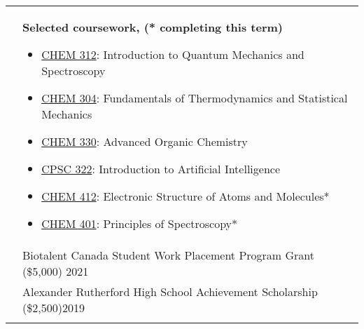 \documentclass[letterpaper, 11pt]{article}
\begin{document}
\begin{longtable}{p{1.3in}p{4.8in}}
	 & \textbf{Selected coursework, (* completing this term)}
	\begin{itemize}[noitemsep,leftmargin=*]
		\item \underline{CHEM 312}: Introduction to Quantum Mechanics and Spectroscopy
		\item \underline{CHEM 304}: Fundamentals of Thermodynamics and Statistical Mechanics
		\item \underline{CHEM 330}: Advanced Organic Chemistry
		\item \underline{CPSC 322}: Introduction to Artificial Intelligence
		\item \underline{CHEM 412}: Electronic Structure of Atoms and Molecules*
		\item \underline{CHEM 401}: Principles of Spectroscopy*
	\end{itemize}                                                                                                                       \\



	{\color{Blue}{Honours and}}
	 & Biotalent Canada Student Work Placement Program Grant (\$5,000) \hfill 2021                                                                                                                            \\
	{\color{Blue}{Scholarships}}
	 & Alexander Rutherford High School Achievement Scholarship (\$2,500)\hfill 2019                                                                                                                          \\
	 &                                                                                                                                                                                                        \\


\end{longtable}
\end{document}
